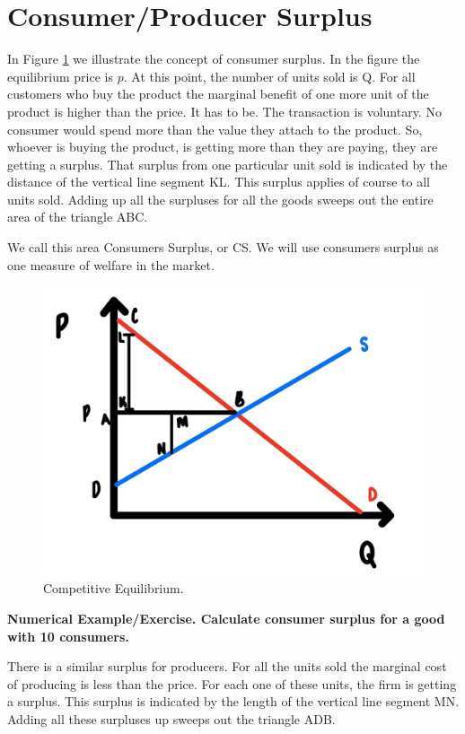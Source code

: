 \documentclass[
]{book}
\begin{document}
\hypertarget{consumerproducer-surplus}{%
\section{Consumer/Producer Surplus}\label{consumerproducer-surplus}}

In Figure \ref{fig:compmarkets02} we illustrate the concept of consumer surplus. In the figure the equilibrium price is \(p\). At this point, the number of units sold is Q. For all customers who buy the product the marginal benefit of one more unit of the product is higher than the price. It has to be. The transaction is voluntary. No consumer would spend more than the value they attach to the product. So, whoever is buying the product, is getting more than they are paying, they are getting a surplus. That surplus from one particular unit sold is indicated by the distance of the vertical line segment KL. This surplus applies of course to all units sold. Adding up all the surpluses for all the goods sweeps out the entire area of the triangle ABC.

We call this area Consumers Surplus, or CS. We will use consumers surplus as one measure of welfare in the market.

\begin{figure}

{\centering \includegraphics[width=0.5\linewidth]{img/compmarkets/fig2} 

}

\caption{Competitive Equilibrium.}\label{fig:compmarkets02}
\end{figure}

\begin{addition}
\textbf{Numerical Example/Exercise. Calculate consumer surplus for a good with 10 consumers.}

\end{addition}

There is a similar surplus for producers. For all the units sold the marginal cost of producing is less than the price. For each one of these units, the firm is getting a surplus. This surplus is indicated by the length of the vertical line segment MN. Adding all these surpluses up sweeps out the triangle ADB.
\end{document}
